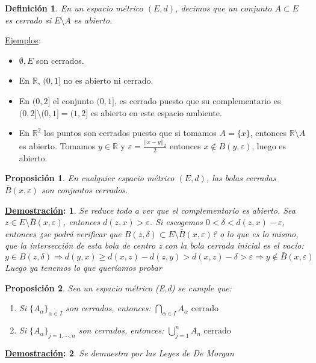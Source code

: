 \documentclass[10pt,a4paper,openright]{book}
\theoremstyle{break}
\newtheorem*{defi}{Definición}
\newtheorem*{prop}{Proposición}
\newtheorem*{demo}{\underline{Demostración}:}
\begin{document}
\begin{defi}
En un espacio métrico $(E,d)$, decimos que un conjunto $A\subset E$ es cerrado si $E\setminus{A}$ es abierto.
\end{defi}

\underline{Ejemplos}:
\begin{itemize}
\item $\emptyset, E$ son cerrados.
\item En $\mathbb{R}$, $(0,1]$ no es abierto ni cerrado.
\item En $(0,2]$ el conjunto $(0,1]$, es cerrado puesto que su complementario es $(0,2]\setminus(0,1] = (1,2]$ es abierto en este espacio ambiente.
\item En $\mathbb{R}^{2}$ los puntos son cerrados puesto que si tomamos $A=\{x\}$, entonces $\mathbb{R}\setminus A$ es abierto. Tomamos $y\in \mathbb{R}$ y $\varepsilon = \frac{||x-y||_2}{2}$ entonces $x\notin B(y,\varepsilon)$, luego es abierto.
\end{itemize}

\begin{prop}
En cualquier espacio métrico $(E,d)$, las bolas cerradas $\bar{B}(x,\varepsilon)$ son conjuntos cerrados.
\end{prop}

\begin{demo}
Se reduce todo a ver que el complementario es abierto. Sea $z\in E\setminus \bar{B}(x,\varepsilon)$, entonces $d(z,x) > \varepsilon$.
Si escogemos $0 < \delta < d(z,x) - \varepsilon$,  entonces ¿se podrá verificar que $B(z,\delta)\subset E\setminus \bar{B}(x,\varepsilon)$? o lo que es lo mismo, que la intersección de esta bola de centro z con la bola cerrada inicial es el vacío:
$$y \in B(z,\delta)\Rightarrow d(y,x)\geq d(x,z) - d(z,y)> d(x,z) - \delta >\varepsilon \Rightarrow y \notin \bar{B}(x,\varepsilon)$$
Luego ya tenemos lo que queríamos probar
\end{demo}

\begin{prop}
Sea un espacio métrico (E,d) se cumple que:
\begin{enumerate}
\item Si $\{A_\alpha\}_{\alpha \in I}$ son cerrados, entonces: $\bigcap_{\alpha \in I} A_{\alpha} \mbox{ cerrado}$
\item Si $\{A_\alpha\}_{j = 1, \cdots, n}$ son cerrados, entonces: $\bigcup_{j = 1}^{n} A_{n} \mbox{ cerrado}$
\end{enumerate}
\end{prop}
\begin{demo}
Se demuestra por las Leyes de De Morgan
\end{demo}
\end{document}
